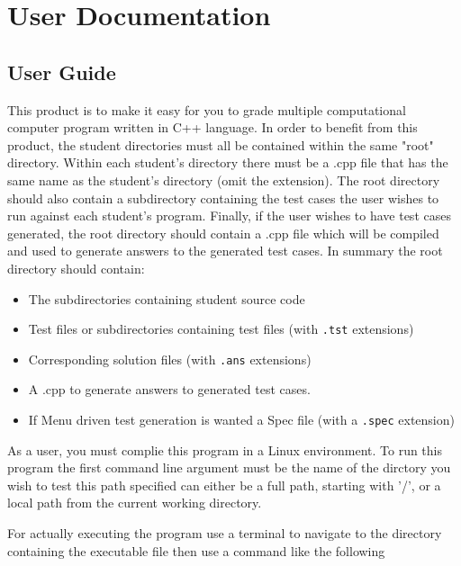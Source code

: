 
\chapter{User Documentation}


\section{User Guide}

This product is to make it easy for you to grade multiple computational computer program written in C++ language. In order to benefit from this product, the student directories must all be contained within the same "root" directory.
Within each student's directory there must be a .cpp file that has the same name as the student's directory (omit the extension). The root directory should also contain a subdirectory containing the test cases the user wishes to run against each student's program.
Finally, if the user wishes to have test cases generated, the root directory should contain a .cpp file which will be compiled and used to generate answers to the generated test cases. In summary the root directory should contain:
    \begin{itemize}
  		\item The subdirectories containing student source code
  		\item Test files or subdirectories containing test files (with {\tt .tst} extensions)
  		\item Corresponding solution files (with {\tt .ans} extensions)
        \item A .cpp to generate answers to generated test cases. 
                    \item If Menu driven test generation is wanted a Spec file (with a {\tt .spec} extension)
	\end{itemize} 

As a user, you must complie this program in a Linux environment. To run this program the first command line argument must be the name of the dirctory you wish to test this path specified can either be a full path, starting with '/', or a local path from the current working directory.

For actually executing the program use a terminal to navigate to the directory containing the executable file then use a command like the following

